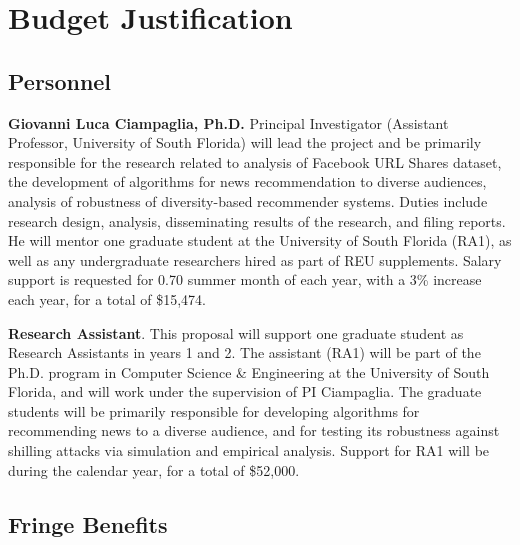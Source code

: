 \section*{Budget Justification}

\subsection*{Personnel}

\textbf{Giovanni Luca Ciampaglia, Ph.D.} Principal Investigator (Assistant Professor, University of South Florida) will lead the project and be primarily responsible for the research related to analysis of Facebook URL Shares dataset, the development of algorithms for news recommendation to diverse audiences, analysis of robustness of diversity-based recommender systems. Duties include research design, analysis, disseminating results of the research, and filing reports. He will mentor one graduate student at the University of South Florida (RA1), as well as any undergraduate researchers hired as part of REU supplements. Salary support is requested for 0.70 summer month of each year, with a 3\% increase each year, for a total of \$15,474.

\textbf{Research Assistant}. This proposal will support one graduate student as Research Assistants in years 1 and 2. The assistant (RA1) will be part of the Ph.D. program in Computer Science \& Engineering at the University of South Florida, and will work under the supervision of PI Ciampaglia. The graduate students will be primarily responsible for developing algorithms for recommending news to a diverse audience, and for testing its robustness against shilling attacks via simulation and empirical analysis. Support for RA1 will be during the calendar year, for a total of \$52,000.


\subsection*{Fringe Benefits}

